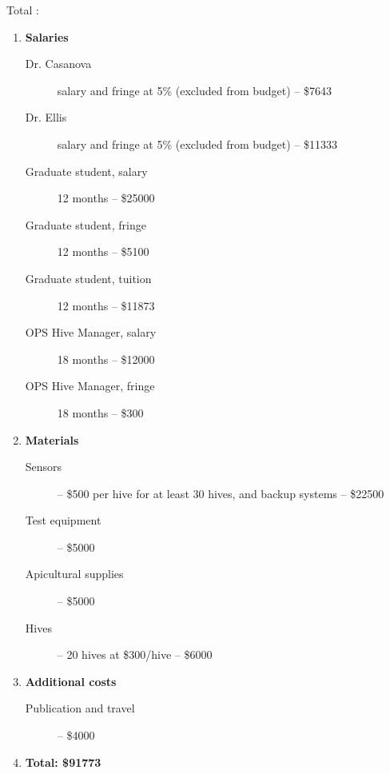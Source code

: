 Total :
\begin{enumerate}
\item \textbf{Salaries}
\begin{description}
\item[Dr. Casanova] salary and fringe at 5\% (excluded from budget) -- \$7643
\item[Dr. Ellis] salary and fringe at 5\%  (excluded from budget)  -- \$11333
\item[Graduate student, salary] 12 months -- \$25000
\item[Graduate student, fringe] 12 months -- \$5100
\item[Graduate student, tuition] 12 months -- \$11873
\item[OPS Hive Manager, salary] 18 months -- \$12000
\item[OPS Hive Manager, fringe] 18 months -- \$300
\end{description}
\item \textbf{Materials}
\begin{description}
\item[Sensors] -- \$500 per hive for at least 30 hives, and backup systems -- \$22500 
\item[Test equipment] -- \$5000 
\item[Apicultural supplies] -- \$5000
\item[Hives] -- 20 hives at \$300/hive -- \$6000
\end{description}
\item \textbf{Additional costs}
\begin{description}
\item[Publication and travel] -- \$4000
\end{description}\item \textbf{Total: \$91773} 
\end{enumerate}
